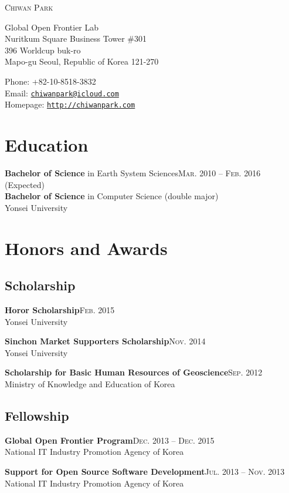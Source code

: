 \documentclass[11pt,a4paper]{article}
\makeatletter
\def\myname{Chiwan Park}
\def\myphone{+82-10-8518-3832}
\def\myaddress{Global Open Frontier Lab\\
Nuritkum Square Business Tower \#301\\
396 Worldcup buk-ro\\
Mapo-gu Seoul, Republic of Korea 121-270}
\def\myemail{chiwanpark@icloud.com}
\def\myhomepage{http://chiwanpark.com}
\renewenvironment{itemize}{
  \begin{list}{}{
    \setlength{\leftmargin}{1.5em}
    \setlength{\itemsep}{0.5em}
    \setlength{\parskip}{0pt}
    \setlength{\parsep}{0.25em}
  }
}{
  \end{list}
}
\makeatother
\begin{document}
\par{\Huge \textsc{\myname}}

\bigskip

\begin{minipage}[t]{0.495\textwidth}
  \myaddress
\end{minipage}
\begin{minipage}[t]{0.495\textwidth}
  Phone: \myphone \\
  Email: \href{mailto:\myemail}{\tt \myemail} \\
  Homepage: \href{\myhomepage}{\tt \myhomepage}
\end{minipage}

\section*{Education}
\begin{itemize}
  \item \textbf{Bachelor of Science} in Earth System Sciences\hfill\textsc{Mar. 2010 -- Feb. 2016} (Expected)\\
        \textbf{Bachelor of Science} in Computer Science (double major)\\
        Yonsei University
\end{itemize}

\section*{Honors and Awards}
\subsection*{Scholarship}
\begin{itemize}
  \item \textbf{Horor Scholarship}\hfill\textsc{Feb. 2015}\\
        Yonsei University
  \item \textbf{Sinchon Market Supporters Scholarship}\hfill\textsc{Nov. 2014}\\
        Yonsei University
  \item \textbf{Scholarship for Basic Human Resources of Geoscience}\hfill\textsc{Sep. 2012}\\
        Ministry of Knowledge and Education of Korea
\end{itemize}
\subsection*{Fellowship}
\begin{itemize}
  \item \textbf{Global Open Frontier Program}\hfill\textsc{Dec. 2013 -- Dec. 2015}\\
        National IT Industry Promotion Agency of Korea
  \item \textbf{Support for Open Source Software Development}\hfill\textsc{Jul. 2013 -- Nov. 2013}\\
        National IT Industry Promotion Agency of Korea
\end{itemize}
\end{document}
